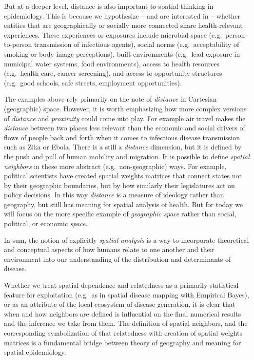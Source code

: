 \documentclass[
]{book}
\begin{document}
But at a deeper level, distance is also important to spatial thinking in epidemiology. This is because we hypothesize -- and are interested in -- whether entities that are geographically or socially more connected share health-relevant experiences. These experiences or exposures include microbial space (e.g.~person-to-person transmission of infectious agents), social norms (e.g.~acceptability of smoking or body image perceptions), built environments (e.g.~lead exposure in municipal water systems, food environments), access to health resources (e.g.~health care, cancer screening), and access to opportunity structures (e.g.~good schools, safe streets, employment opportunities).

The examples above rely primarily on the note of \emph{distance} in Cartesian (geographic) space. However, it is worth emphasizing how more complex versions of \emph{distance} and \emph{proximity} could come into play. For example air travel makes the \emph{distance} between two places less relevant than the economic and social drivers of flows of people back and forth when it comes to infectious disease transmission such as Zika or Ebola. There is a still a \emph{distance} dimension, but it is defined by the push and pull of human mobility and migration. It is possible to define \emph{spatial neighbors} in these more abstract (e.g.~non-geographic) ways. For example, political scientists have created spatial weights matrices that connect states not by their geographic boundaries, but by how similarly their legislatures act on policy decisions. In this way \emph{distance} is a measure of ideology rather than geography, but still has meaning for spatial analysis of health. But for today we will focus on the more specific example of \emph{geographic space} rather than social, political, or economic \emph{space}.

In sum, the notion of explicitly \emph{spatial analysis} is a way to incorporate theoretical and conceptual aspects of how humans relate to one another and their environment into our understanding of the distribution and determinants of disease.

Whether we treat spatial dependence and relatedness as a primarily statistical feature for exploitation (e.g.~as in spatial disease mapping with Empirical Bayes), or as an attribute of the local ecosystem of disease generation, it is clear that when and how neighbors are defined is influential on the final numerical results and the inference we take from them. The definition of spatial neighbors, and the corresponding symbolization of that relatedness with creation of spatial weights matrices is a fundamental bridge between theory of geography and meaning for spatial epidemiology.
\end{document}
